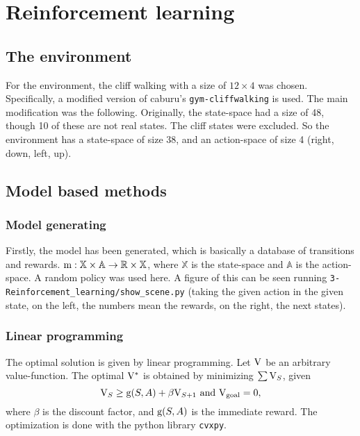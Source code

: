 \section{Reinforcement learning}

\subsection{The environment}

For the environment, the cliff walking with a size of $12\times4$ was chosen.
Specifically, a modified version of caburu's \verb|gym-cliffwalking|\cite{cliffwalking} is used.
The main modification was the following.
Originally, the state-space had a size of 48, though 10 of these are not real states.
The cliff states were excluded.
So the environment has a state-space of size 38,
and an action-space of size 4 (right, down, left, up).


\subsection{Model based methods}

\subsubsection{Model generating}

Firstly, the model has been generated, which is basically a database of transitions and
rewards. $\mathrm{m}: \mathbb{X}\times\mathbb{A}\rightarrow\mathbb{R}\times\mathbb{X}$,
where $\mathbb{X}$ is the state-space and $\mathbb{A}$ is the action-space. A random
policy was used here. A figure of this can be seen running
\verb|3-Reinforcement_learning/show_scene.py| (taking the given action in the given state,
on the left, the numbers mean the rewards, on the right, the next states).

\subsubsection{Linear programming}

The optimal solution is given by linear programming.
Let $\mathrm{V}$ be an arbitrary value-function.
The optimal $\mathrm{V}^*$ is obtained by minimizing $\sum\mathrm{V}_S$, given
\begin{equation}
	\mathrm{V}_S\geq\mathrm{g}
(S, A) + \beta\mathrm{V}_{S+1} \text{ and } \mathrm{V}_\text{goal}=0,
\end{equation}
where $\beta$ is the discount factor, and $\mathrm{g}(S, A)$ is the immediate reward.
The optimization is done with the python library \verb|cvxpy|.

